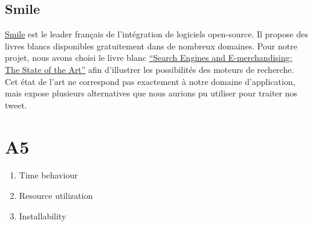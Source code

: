   \subsection{Smile}
    \href{http://www.smile.fr/}{Smile} est le leader français de l'intégration de logiciels open-source. Il propose des livres blancs disponibles gratuitement dans de nombreux domaines. Pour notre projet, nous avons choisi le livre blanc \href{http://www.smile.fr/Livres-blancs}{``Search Engines and E-merchandising: The State of the Art''} afin d'illustrer les possibilités des moteurs de recherche. Cet état de l'art ne correspond pas exactement à notre domaine d'application, mais expose plusieurs alternatives que nous aurions pu utiliser pour traiter nos tweet.

\section{A5}
  \begin{enumerate}
    \item Time behaviour
    \item Resource utilization
    \item Installability
  \end{enumerate}

